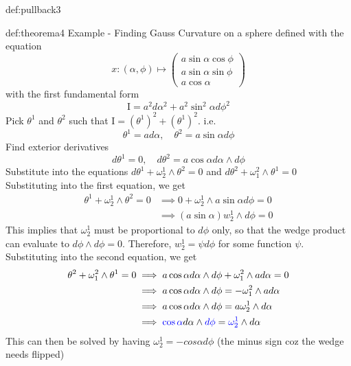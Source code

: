 \documentclass[landscape, 8pt]{extarticle}
\begin{document}
\begin{multicols}{3}
\begin{xmp}{def:pullback}{3}
\end{xmp}



\begin{xmp}{def:theorema}{4}
    Example - Finding Gauss Curvature on a sphere defined with the equation
    \[x:(\alpha, \phi)\mapsto \begin{pmatrix}
        a\sin\alpha \cos\phi \\
        a\sin\alpha \sin\phi \\
        a\cos\alpha
    \end{pmatrix}\]
    with the first fundamental form
    \[\mathrm{I} = a^{2}d\alpha^{2} + a^{2}\sin^{2}\alpha d\phi^{2}\]
    Pick \(\theta^{1}\) and \(\theta^{2}\) such that \(\mathrm{I} = (\theta^{1})^{2} + (\theta^{1})^{2}\). i.e.
    \[\theta^{1} = ad\alpha,\quad \theta^{2} = a\sin\alpha d\phi\]
    Find exterior derivatives
    \[d\theta^{1} = 0 , \quad d\theta^{2} = a\cos\alpha d\alpha\wedge d\phi\]
    Substitute into the equations \(d\theta^{1} + \omega^{1}_{2}\wedge \theta^{2} = 0\) and \(d\theta^{2} + \omega^{2}_{1}\wedge \theta^{1} = 0\)
    Substituting into the first equation, we get
    \begin{align*}
        \theta^{1} + \omega^{1}_{2}\wedge \theta^{2} = 0 &\implies 0 + \omega^{1}_{2}\wedge a\sin\alpha d\phi = 0 \\
        &\implies (a\sin\alpha) w^{1}_{2} \wedge d\phi = 0
    \end{align*}
    This implies that \(\omega^{1}_{2}\) must be proportional to \(d\phi\) only, so that the wedge product can evaluate to \(d\phi \wedge d\phi = 0\). Therefore, \(w^{1}_{2} = \psi d\phi\) for some function \(\psi\). Substituting into the second equation, we get
    \begin{align*}
        \theta^{2} + \omega^{2}_{1}\wedge \theta^{1} = 0 &\implies a\cos\alpha d\alpha\wedge d\phi + \omega^{2}_{1}\wedge ad\alpha = 0 \\
        &\implies a\cos\alpha d\alpha\wedge d\phi = -\omega^{2}_{1}\wedge ad\alpha \\
        &\implies a\cos\alpha d\alpha\wedge d\phi = a\omega^{1}_{2}\wedge d\alpha \\
        &\implies \textcolor{blue}{\cos\alpha} d\alpha\wedge \textcolor{blue}{d\phi} = \textcolor{blue}{\omega^{1}_{2}}\wedge d\alpha \\
    \end{align*}
    This can then be solved by having \(\omega^{1}_{2} = -cos\alpha d\phi\) (the minus sign coz the wedge needs flipped)

\end{xmp}
\end{multicols}
\end{document}
